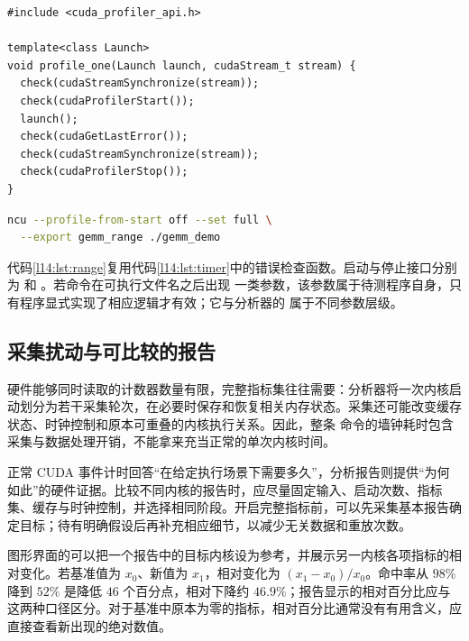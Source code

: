 \noindent\begin{minipage}{\linewidth}
\begin{lstlisting}[caption={以运行时接口圈定目标内核},label={l14:lst:range}]
#include <cuda_profiler_api.h>

template<class Launch>
void profile_one(Launch launch, cudaStream_t stream) {
  check(cudaStreamSynchronize(stream));
  check(cudaProfilerStart());
  launch();
  check(cudaGetLastError());
  check(cudaStreamSynchronize(stream));
  check(cudaProfilerStop());
}
\end{lstlisting}
\begin{lstlisting}[style=cuda,language=bash,numbers=none,caption={配合程序内部范围进行采集}]
ncu --profile-from-start off --set full \
  --export gemm_range ./gemm_demo
\end{lstlisting}
\end{minipage}

代码\ref{l14:lst:range}复用代码\ref{l14:lst:timer}中的错误检查函数。启动与停止接口分别为  和 。若命令在可执行文件名之后出现  一类参数，该参数属于待测程序自身，只有程序显式实现了相应逻辑才有效；它与分析器的  属于不同参数层级。

\subsection{采集扰动与可比较的报告}

硬件能够同时读取的计数器数量有限，完整指标集往往需要：分析器将一次内核启动划分为若干采集轮次，在必要时保存和恢复相关内存状态。采集还可能改变缓存状态、时钟控制和原本可重叠的内核执行关系。因此，整条  命令的墙钟耗时包含采集与数据处理开销，不能拿来充当正常的单次内核时间。

正常 CUDA 事件计时回答“在给定执行场景下需要多久”，分析报告则提供“为何如此”的硬件证据。比较不同内核的报告时，应尽量固定输入、启动次数、指标集、缓存与时钟控制，并选择相同阶段。开启完整指标前，可以先采集基本报告确定目标；待有明确假设后再补充相应细节，以减少无关数据和重放次数。

图形界面的可以把一个报告中的目标内核设为参考，并展示另一内核各项指标的相对变化。若基准值为 $x_0$、新值为 $x_1$，相对变化为 $(x_1-x_0)/x_0$。命中率从 $98\%$ 降到 $52\%$ 是降低 $46$ 个百分点，相对下降约 $46.9\%$；报告显示的相对百分比应与这两种口径区分。对于基准中原本为零的指标，相对百分比通常没有有用含义，应直接查看新出现的绝对数值。
